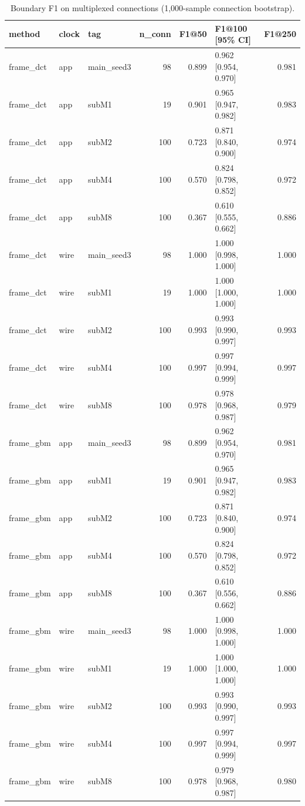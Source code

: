 \begin{table}
\caption{Boundary F1 on multiplexed connections (1,000-sample connection bootstrap).}
\label{tab:seg}
\begin{tabular}{lllrrlr}
\toprule
method & clock & tag & n\_conn & F1@50 & F1@100 [95\% CI] & F1@250 \\
\midrule
frame\_dct & app & main\_seed3 & 98 & 0.899 & 0.962 [0.954, 0.970] & 0.981 \\
frame\_dct & app & subM1 & 19 & 0.901 & 0.965 [0.947, 0.982] & 0.983 \\
frame\_dct & app & subM2 & 100 & 0.723 & 0.871 [0.840, 0.900] & 0.974 \\
frame\_dct & app & subM4 & 100 & 0.570 & 0.824 [0.798, 0.852] & 0.972 \\
frame\_dct & app & subM8 & 100 & 0.367 & 0.610 [0.555, 0.662] & 0.886 \\
frame\_dct & wire & main\_seed3 & 98 & 1.000 & 1.000 [0.998, 1.000] & 1.000 \\
frame\_dct & wire & subM1 & 19 & 1.000 & 1.000 [1.000, 1.000] & 1.000 \\
frame\_dct & wire & subM2 & 100 & 0.993 & 0.993 [0.990, 0.997] & 0.993 \\
frame\_dct & wire & subM4 & 100 & 0.997 & 0.997 [0.994, 0.999] & 0.997 \\
frame\_dct & wire & subM8 & 100 & 0.978 & 0.978 [0.968, 0.987] & 0.979 \\
frame\_gbm & app & main\_seed3 & 98 & 0.899 & 0.962 [0.954, 0.970] & 0.981 \\
frame\_gbm & app & subM1 & 19 & 0.901 & 0.965 [0.947, 0.982] & 0.983 \\
frame\_gbm & app & subM2 & 100 & 0.723 & 0.871 [0.840, 0.900] & 0.974 \\
frame\_gbm & app & subM4 & 100 & 0.570 & 0.824 [0.798, 0.852] & 0.972 \\
frame\_gbm & app & subM8 & 100 & 0.367 & 0.610 [0.556, 0.662] & 0.886 \\
frame\_gbm & wire & main\_seed3 & 98 & 1.000 & 1.000 [0.998, 1.000] & 1.000 \\
frame\_gbm & wire & subM1 & 19 & 1.000 & 1.000 [1.000, 1.000] & 1.000 \\
frame\_gbm & wire & subM2 & 100 & 0.993 & 0.993 [0.990, 0.997] & 0.993 \\
frame\_gbm & wire & subM4 & 100 & 0.997 & 0.997 [0.994, 0.999] & 0.997 \\
frame\_gbm & wire & subM8 & 100 & 0.978 & 0.979 [0.968, 0.987] & 0.980 \\

\end{tabular}
\end{table}
